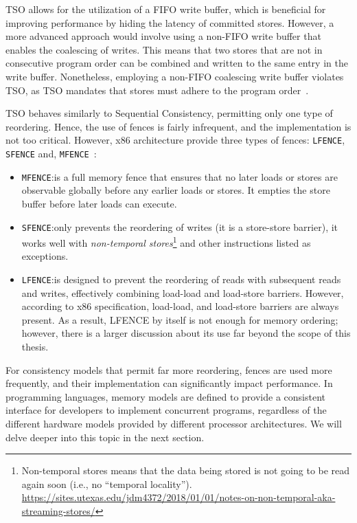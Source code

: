 TSO allows for the utilization of a FIFO write buffer, which is beneficial for improving performance by hiding the latency of committed stores. However, a more advanced approach would involve using a non-FIFO write buffer that enables the coalescing of writes. This means that two stores that are not in consecutive program order can be combined and written to the same entry in the write buffer. Nonetheless, employing a non-FIFO coalescing write buffer violates TSO, as TSO mandates that stores must adhere to the program order~\cite{DBLP_series_synthesis_2020Nagarajan}.

TSO behaves similarly to Sequential Consistency, permitting only one type of reordering. Hence, the use of fences is fairly infrequent, and the implementation is not too critical. However, x86 architecture provide three types of fences: \texttt{LFENCE}, \texttt{SFENCE} and, \texttt{MFENCE}~\cite{devices_amd64,guideintel}:

\begin{itemize}
  \item \texttt{MFENCE}:\@ is a full memory fence that ensures that no later loads or stores are observable globally before any earlier loads or stores. It empties the store buffer before later loads can execute.
  \item \texttt{SFENCE}:\@ only prevents the reordering of writes (it is a store-store barrier), it works well with \textit{non-temporal stores}\footnote{Non-temporal stores means that the data being stored is not going to be read again soon (i.e., no ``temporal locality'').  \url{https://sites.utexas.edu/jdm4372/2018/01/01/notes-on-non-temporal-aka-streaming-stores/}} and other instructions listed as exceptions.
  \item \texttt{LFENCE}:\@ is designed to prevent the reordering of reads with subsequent reads and writes, effectively combining load-load and load-store barriers. However, according to x86 specification, load-load, and load-store barriers are always present. As a result, LFENCE by itself is not enough for memory ordering; however, there is a larger discussion about its use far beyond the scope of this thesis.
\end{itemize}

For consistency models that permit far more reordering, fences are used more frequently, and their implementation can significantly impact performance. In programming languages, memory models are defined to provide a consistent interface for developers to implement concurrent programs, regardless of the different hardware models provided by different processor architectures. We will delve deeper into this topic in the next section.

